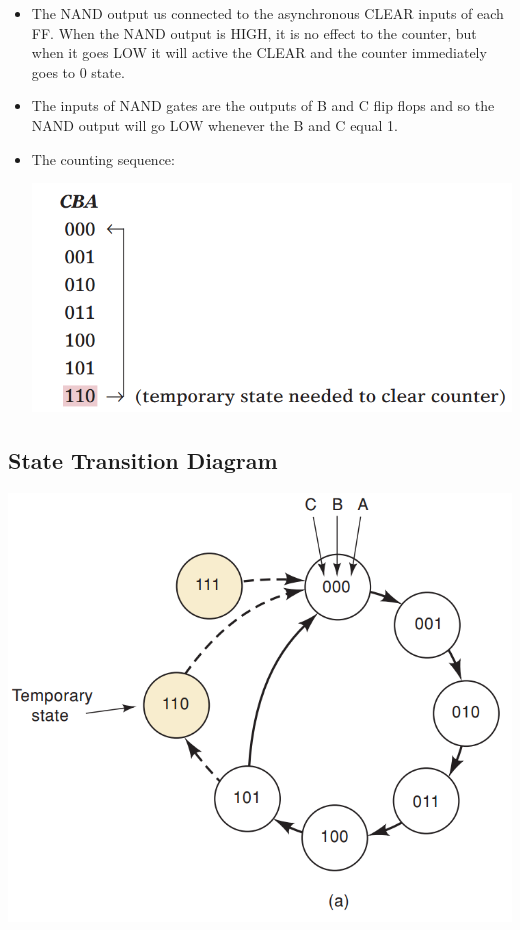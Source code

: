 \documentclass[12pt]{article}
\begin{document}
\begin{itemize}
	\item The NAND output us connected to the asynchronous CLEAR inputs of each FF. When the NAND output is HIGH, it is no effect to the counter, but when it goes LOW it will active the CLEAR and the counter immediately goes to 0 state.
	\item The inputs of NAND gates are the outputs of B and C flip flops and so the NAND output will go LOW whenever the B and C equal 1.
	\item The counting sequence: \\
		\begin{center}
			\includegraphics[scale = 0.6]{hinh43}
		\end{center}
\end{itemize}
\subsection{State Transition Diagram}
\includegraphics[scale = 0.6]{hinh44}
\bigbreak
\end{document}
